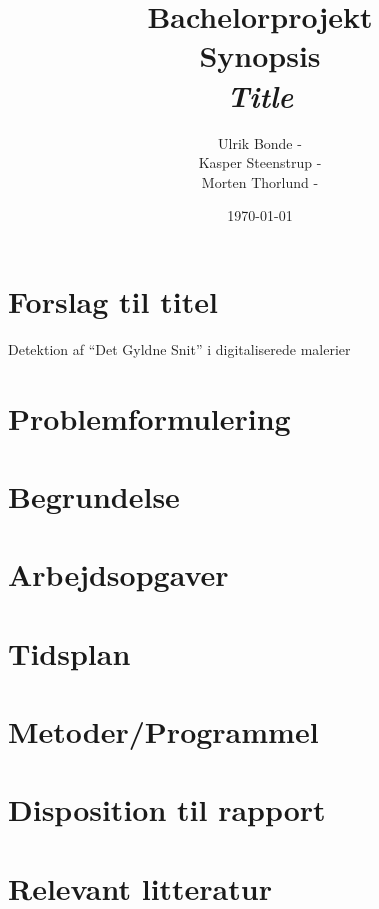 \documentclass[a4paper, 10pt, danish, final]{article}
\title{Bachelorprojekt\\Synopsis\\\emph{Title}}
\author{Ulrik Bonde - \mailto{bonde@diku.dk}\\
Kasper Steenstrup - \mailto{khsj@diku.dk}\\
Morten Thorlund - \mailto{thorlund@diku.dk}}
\date{\today}
\begin{document}
\maketitle
\thispagestyle{empty}




\section*{Forslag til titel}
Detektion af ``Det Gyldne Snit'' i digitaliserede malerier

\section*{Problemformulering}


\section*{Begrundelse}


\section*{Arbejdsopgaver}


\section*{Tidsplan}


\section*{Metoder/Programmel}
% 

\section*{Disposition til rapport}


\section*{Relevant litteratur}


\end{document}

